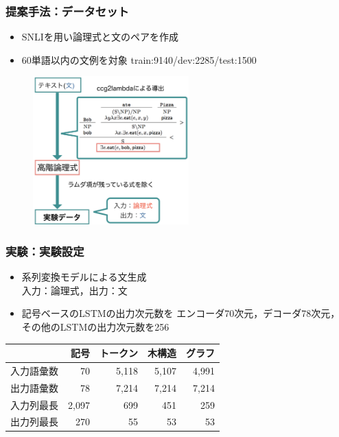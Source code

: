 \documentclass[dvipdfmx,cjk]{beamer}
\begin{document}
\begin{frame}
\frametitle{提案手法：データセット}
\begin{itemize}
  \item
SNLIを用い論理式と文のペアを作成

\item 60単語以内の文例を対象
train:9140/dev:2285/test:1500\\

\end{itemize}
\begin{center}
\begin{figure}[h]
	\includegraphics[width=6cm]{edit_data.png}
        \label{fig:editdata}
\end{figure}
\end{center}

\end{frame}

\begin{frame}
\frametitle{実験：実験設定}
\begin{itemize}
  \item 系列変換モデルによる文生成 \\
入力：論理式，出力：文\\
\item 記号ベースのLSTMの出力次元数を
エンコーダ70次元，デコーダ78次元，\\
その他のLSTMの出力次元数を256
\end{itemize}

\begin{center}
  \begin{tabular}{rrrrr}
    \hline
    　  & 記号 & トークン & 木構造 & グラフ \\
    \hline \hline
    入力語彙数  & 70  &  5,118 & 5,107 & 4,991\\
    出力語彙数  & 78   & 7,214 & 7,214 & 7,214\\
    入力列最長 & 2,097  & 699 & 451 & 259 \\
    出力列最長 & 270  & 55 & 53 & 53 \\
    \hline
  \end{tabular}
\end{center}
\end{frame}
\end{document}
